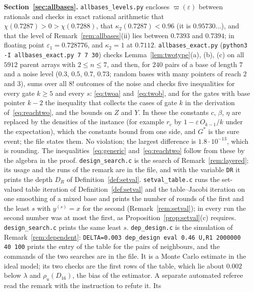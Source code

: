 \documentclass[11pt]{amsart}
\theoremstyle{definition}
\theoremstyle{remark}
\newcommand{\eps}{\varepsilon}
\begin{document}
\medskip\noindent\textbf{Section~\ref{sec:allbases}.} \texttt{allbases\_levels.py} encloses
$\varpi(\eps)$ between rationals and checks in exact rational arithmetic that
$\chi(0.7287)>0>\chi(0.7288)$, that $\kappa_2(0.7287)<0.96$ (it is $0.95730\ldots$), and that the
level of Remark~\ref{rem:allbases}(ii) lies between $0.7393$ and $0.7394$; in floating point
$\eps_1=0.728776$, and $\kappa_2=1$ at $0.7112$. \texttt{allbases\_exact.py} (\texttt{python3 -I
allbases\_exact.py 7 7 30}) checks Lemma~\ref{lem:twotype}(a), (b), (c) on all $5912$ parent
arrays with $2\le n\le7$, and then, for $240$ pairs of a base of length $7$ and a noise level
($0.3$, $0.5$, $0.7$, $0.73$; random bases with many pointers of reach $2$ and $3$), sums over all
$8!$ outcomes of the noise and checks five inequalities for every gate $k\ge5$ and every $s$:
\eqref{eq:twoa} and~\eqref{eq:twob}, and for the gates with base pointer $k-2$ the inequality
that collects the cases of gate $k$ in the derivation of~\eqref{eq:reachtwo}, and the bounds on
$Z$ and $Y$. In these the constants
$c$, $\beta$, $\eta$ are replaced by the densities of the instance (for example $r_c$ by
$1-\eps\,O_{k-1}/k$ under the expectation), which the constants bound from one side, and $G^*$ is
the sure event; the file states them. No violation; the largest difference is $1.8\cdot10^{-13}$,
which is rounding. The inequalities~\eqref{eq:generic} and~\eqref{eq:reachtwo} follow from these
by the algebra in the proof. \texttt{design\_search.c} is the search of
Remark~\ref{rem:layered}; its usage and the runs of the remark are in the file, and with the
variable \texttt{DR} it prints the depth $D_R$ of Definition~\ref{def:setval}.
\texttt{setval\_table.c} runs the set-valued table iteration of Definition~\ref{def:setval} and
the table--Jacobi iteration on one smoothing of a mixed base and prints the number of rounds of
the first and the least $s$ with $y^{(s)}=x$ for the second (Remark~\ref{rem:setval}); in every
run the second number was at most the first, as Proposition~\ref{prop:setval}(c) requires.
\texttt{design\_search.c} prints the same least $s$. \texttt{dep\_design.c} is the simulation of
Remark~\ref{rem:dependent}: \texttt{DELTA=0.003 dep\_design eval 0.46 U,R1 2000000 40 100} prints
the entry of the table for the pairs of neighbours, and the commands of the two searches are in
the file. It is a Monte Carlo estimate in the ideal model; its two checks are the first rows of
the table, which lie about $0.002$ below $\lambda$ and $\rho_u(D_{16})$, the bias of the
estimator. A separate automated referee read the remark with the instruction to refute it. Its
\end{document}
